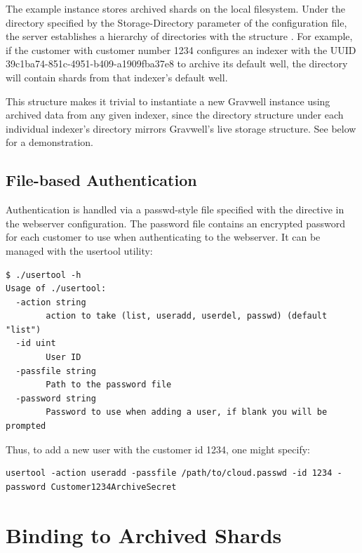 The example instance stores archived shards on the local filesystem.
Under the directory specified by the Storage-Directory parameter of the
configuration file, the server establishes a hierarchy of directories
with the structure . For example, if
the customer with customer number 1234 configures an indexer with
the UUID 39c1ba74-851c-4951-b409-a1909fba37e8 to archive its default
well, the directory
 will contain
shards from that indexer's default well.

This structure makes it trivial to instantiate a new Gravwell instance
using archived data from any given indexer, since the directory
structure under each individual indexer's directory mirrors Gravwell's
live storage structure. See below for a demonstration.

\subsection{File-based Authentication}

Authentication is handled via a passwd-style file specified with the
 directive in the webserver configuration. The password
file contains an encrypted password for each customer to use when
authenticating to the webserver. It can be managed with the usertool
utility:

\begin{Verbatim}[breaklines=true]
$ ./usertool -h
Usage of ./usertool:
  -action string
        action to take (list, useradd, userdel, passwd) (default "list")
  -id uint
        User ID
  -passfile string
        Path to the password file
  -password string
        Password to use when adding a user, if blank you will be prompted
\end{Verbatim}

Thus, to add a new user with the customer id 1234, one might specify:

\begin{Verbatim}[breaklines=true]
usertool -action useradd -passfile /path/to/cloud.passwd -id 1234 -password Customer1234ArchiveSecret
\end{Verbatim}


\section{Binding to Archived Shards}

